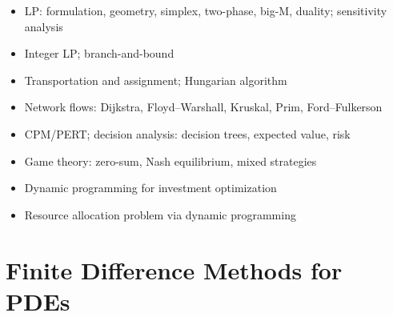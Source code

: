 \documentclass{amsart}
\begin{document}
\begin{itemize}
  \item LP: formulation, geometry, simplex, two-phase, big-M, duality; sensitivity analysis
  \item Integer LP; branch-and-bound
  \item Transportation and assignment; Hungarian algorithm
  \item Network flows: Dijkstra, Floyd--Warshall, Kruskal, Prim, Ford--Fulkerson
  \item CPM/PERT; decision analysis: decision trees, expected value, risk
  \item Game theory: zero-sum, Nash equilibrium, mixed strategies
  \item Dynamic programming for investment optimization
  \item Resource allocation problem via dynamic programming
\end{itemize}

\section{Finite Difference Methods for PDEs}
\end{document}
